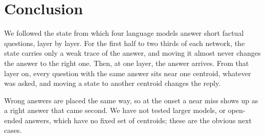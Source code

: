 \section{Conclusion}
\label{sec:conclusion}

We followed the state from which four language models answer short factual questions, layer by layer. For the first half to two thirds of each network, the state carries only a weak trace of the answer, and moving it almost never changes the answer to the right one. Then, at one layer, the answer arrives. From that layer on, every question with the same answer sits near one centroid, whatever was asked, and moving a state to another centroid changes the reply.

Wrong answers are placed the same way, so at the onset a near miss shows up as a right answer that came second. We have not tested larger models, or open-ended answers, which have no fixed set of centroids; these are the obvious next cases.
